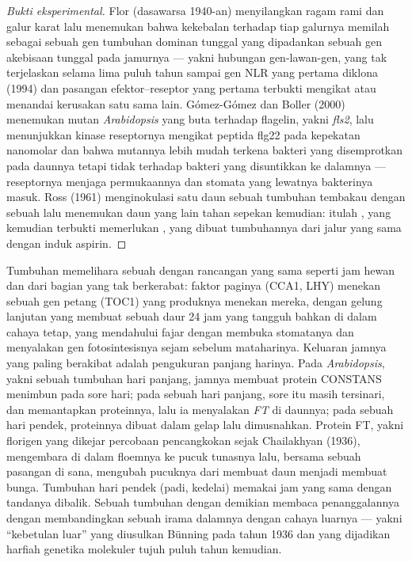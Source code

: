 \begin{proof}[Bukti eksperimental]
Flor (dasawarsa 1940-an) menyilangkan ragam rami dan galur karat lalu menemukan bahwa
kekebalan terhadap tiap galurnya memilah sebagai sebuah gen tumbuhan dominan tunggal
yang dipadankan sebuah gen akebisaan tunggal pada jamurnya --- yakni hubungan gen-lawan-gen,
yang tak terjelaskan selama lima puluh tahun sampai gen NLR yang pertama
diklona (1994) dan pasangan efektor--reseptor yang pertama terbukti mengikat atau
menandai kerusakan satu sama lain. Gómez-Gómez dan Boller (2000) menemukan
mutan \emph{Arabidopsis} yang buta terhadap flagelin, yakni \emph{fls2}, lalu menunjukkan
kinase reseptornya mengikat peptida flg22 pada kepekatan nanomolar
dan bahwa mutannya lebih mudah terkena bakteri yang disemprotkan pada
daunnya tetapi tidak terhadap bakteri yang disuntikkan ke dalamnya --- reseptornya menjaga
permukaannya dan stomata yang lewatnya bakterinya masuk. Ross (1961)
menginokulasi satu daun sebuah tumbuhan tembakau dengan sebuah  lalu menemukan daun
yang lain tahan sepekan kemudian: itulah , yang kemudian terbukti
memerlukan , yang dibuat tumbuhannya dari jalur yang sama dengan
induk aspirin.
\end{proof}

\begin{example}\label{ex:b3:plant-molecular-physiology:clock}
Tumbuhan memelihara sebuah  dengan rancangan yang sama seperti jam hewan dan
dari bagian yang tak berkerabat: faktor paginya (CCA1, LHY) menekan sebuah gen petang
(TOC1) yang produknya menekan mereka, dengan gelung lanjutan yang membuat sebuah
daur 24 jam yang tangguh bahkan di dalam cahaya tetap, yang mendahului fajar dengan
membuka stomatanya dan menyalakan gen fotosintesisnya sejam sebelum
mataharinya. Keluaran jamnya yang paling berakibat adalah pengukuran
panjang harinya. Pada \emph{Arabidopsis}, yakni sebuah tumbuhan hari panjang, jamnya membuat
protein CONSTANS menimbun pada sore hari; pada sebuah hari panjang, sore
itu masih tersinari,  dan  memantapkan
proteinnya, lalu ia menyalakan \emph{FT} di daunnya; pada sebuah hari pendek, proteinnya
dibuat dalam gelap lalu dimusnahkan. Protein FT, yakni florigen
yang dikejar percobaan pencangkokan sejak Chailakhyan (1936), mengembara
di dalam floemnya ke pucuk tunasnya lalu, bersama sebuah pasangan di sana, mengubah
pucuknya dari membuat daun menjadi membuat bunga. Tumbuhan hari pendek (padi,
kedelai) memakai jam yang sama dengan tandanya dibalik. Sebuah tumbuhan dengan demikian membaca
penanggalannya dengan membandingkan sebuah irama dalamnya dengan cahaya luarnya ---
yakni ``kebetulan luar'' yang diusulkan Bünning pada tahun 1936 dan yang
dijadikan harfiah genetika molekuler tujuh puluh tahun kemudian.
\end{example}

